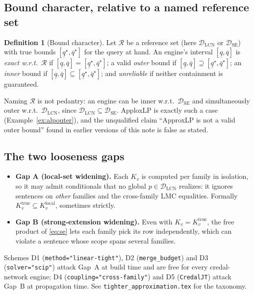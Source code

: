 \documentclass[11pt]{article}
\theoremstyle{definition}
\newtheorem{definition}{Definition}
\newcommand{\lo}{\underline}
\newcommand{\hi}{\overline}
\newcommand{\DSE}{\mathcal{D}_{\mathrm{SE}}}
\newcommand{\DLCN}{\mathcal{D}_{\mathrm{LCN}}}
\begin{document}
\subsection{Bound character, relative to a named reference set}
\begin{definition}[Bound character]\label{def:char}
Let $\mathcal R$ be a reference set (here $\DLCN$ or $\DSE$) with true bounds
$[\lo q^\star,\hi q^\star]$ for the query at hand. An engine's interval $[\lo q,\hi q]$ is
\emph{exact w.r.t.\ $\mathcal R$} if $[\lo q,\hi q]=[\lo q^\star,\hi q^\star]$; a valid \emph{outer}
bound if $[\lo q,\hi q]\supseteq[\lo q^\star,\hi q^\star]$; an \emph{inner} bound if
$[\lo q,\hi q]\subseteq[\lo q^\star,\hi q^\star]$; and \emph{unreliable} if neither containment is
guaranteed.
\end{definition}

Naming $\mathcal R$ is not pedantry: an engine can be inner w.r.t.\ $\DSE$ and simultaneously outer
w.r.t.\ $\DLCN$, since $\DLCN\subseteq\DSE$. ApploxLP is exactly such a case
(Example~\ref{ex:alpouter}), and the unqualified claim ``ApproxLP is not a valid outer bound'' found
in earlier versions of this note is false as stated.

\subsection{The two looseness gaps}\label{sec:gaps}
\begin{itemize}
  \item \textbf{Gap A (local-set widening).} Each $K_v$ is computed per family in isolation, so it
    may admit conditionals that no global $p\in\DLCN$ realizes: it ignores sentences on \emph{other}
    families and the cross-family LMC equalities. Formally
    $K_v^{\mathrm{true}}\subseteq K_v^{\mathrm{local}}$, sometimes strictly.
  \item \textbf{Gap B (strong-extension widening).} Even with $K_v=K_v^{\mathrm{true}}$, the free
    product of \eqref{eq:se} lets each family pick its row independently, which can violate a
    sentence whose scope spans several families.
\end{itemize}
Schemes D1 (\texttt{method="linear-tight"}), D2 (\texttt{merge\_budget}) and D3
(\texttt{solver="scip"}) attack Gap~A at build time and are free for every credal-network engine;
D4 (\texttt{coupling="cross-family"}) and D5 (\texttt{CredalJT}) attack Gap~B at propagation time.
See \texttt{tighter\_approximation.tex} for the taxonomy.
\end{document}
